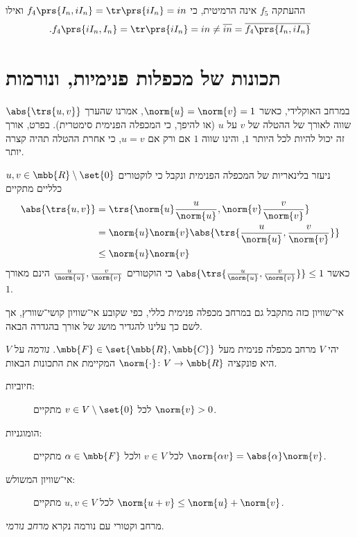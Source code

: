 \documentclass[a4paper,10pt,twoside,openany]{book}
\begin{document}
\begin{solution}
\item
ההעתקה
$f_5$
אינה הרמיטית, כי
$f_4\prs{I_n, iI_n} = \tr\prs{iI_n} = in$
ואילו
\[\text{.} f_4\prs{i I_n, I_n} = \tr\prs{iI_n} =in \neq \overline{in} = \overline{f_4\prs{I_n, iI_n}}\]
\end{solution}

\section{תכונות של מכפלות פנימיות, ונורמות}

במרחב האוקלידי, כאשר
$\norm{u} = \norm{v} = 1$,
אמרנו שהערך
$\abs{\trs{u,v}}$
שווה לאורך של ההטלה של
$v$
על
$u$
(או להיפך, כי המכפלה הפנימית סימטרית).
בפרט, אורך זה יכול להיות לכל היותר
$1$,
והינו שווה
$1$
אם ורק אם
$u = v$,
כי אחרת ההטלה תהיה קצרה יותר.

ניעזר בלינאריות של המכפלה הפנימית ונקבל כי לוקטורים
$u,v \in \mbb{R} \setminus \set{0}$
כלליים מתקיים
\begin{align*}
\abs{\trs{u,v}} &= \trs{\norm{u} \frac{u}{\norm{u}}, \norm{v} \frac{v}{\norm{v}}}
\\&=
\norm{u} \norm{v} \abs{\trs{\frac{u}{\norm{u}}, \frac{v}{\norm{v}}}}
\\&\leq \norm{u} \norm{v}
\end{align*}
כאשר
$\abs{\trs{\frac{u}{\norm{u}}, \frac{v}{\norm{v}}}} \leq 1$
כי הוקטורים
$\frac{u}{\norm{u}}, \frac{v}{\norm{v}}$
הינם מאורך
$1$.

אי־שוויון כזה מתקבל גם במרחב מכפלה פנימית כללי, כפי שקובע אי־שוויון קושי־שוורץ, אך לשם כך עלינו להגדיר מושג של אורך בהגדרה הבאה.

\begin{definition}[נורמה]
יהי
$V$
מרחב מכפלה פנימית מעל
$\mbb{F} \in \set{\mbb{R}, \mbb{C}}$.
\emph{נורמה}
על
$V$
היא פונקציה
$\norm{\cdot} \colon V \to \mbb{R}$
המקיימת את התכונות הבאות.

\begin{description}
\item[חיוביות:]
לכל
$v \in V \setminus \set{0}$
מתקיים
$\norm{v} > 0$.

\item[הומוגניות:]
לכל
$v \in V$
ולכל
$\alpha \in \mbb{F}$
מתקיים
$\norm{\alpha v} = \abs{\alpha} \norm{v}$.

\item[אי־שוויון המשולש:]
לכל
$u,v \in V$
מתקיים
$\norm{u+v} \leq \norm{u} + \norm{v}$.
\end{description}

מרחב וקטורי עם נורמה נקרא
\emph{מרחב נורמי}.
\end{definition}
\end{document}
